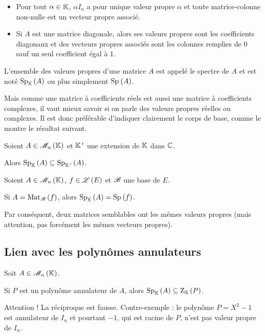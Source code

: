 \begin{ex}
\begin{itemize}
    \item Pour tout \(\alpha\in\mathbb{K}\), \(\alpha I_n\) a pour unique valeur propre \(\alpha\) et toute matrice-colonne non-nulle est un vecteur propre associé. \\
    \item Si \(A\) est une matrice diagonale, alors ses valeurs propres sont les coefficients diagonaux et des vecteurs propres associés sont les colonnes remplies de \(0\) sauf un seul coefficient égal à \(1\).
\end{itemize}
\end{ex}

L'ensemble des valeurs propres d'une matrice \(A\) est appelé le spectre de \(A\) et est noté \(\Sp[\K]{A}\) ou plus simplement \(\Sp{A}\).

Mais comme une matrice à coefficients réels est aussi une matrice à coefficients complexes, il vaut mieux savoir si on parle des valeurs propres réelles ou complexes. Il est donc préférable d'indiquer clairement le corps de base, comme le montre le résultat suivant.

\begin{prop}
Soient \(A\in\M{n}\) et \(\mathbb{K}^{\,\prime}\) une extension de \(\mathbb{K}\) dans \(\mathbb{C}\).

Alors \(\Sp[\K]{A}\subset\Sp[\K\prim]{A}\).
\end{prop}

\begin{prop}
Soient \(A\in\M{n}\), \(f\in\mathscr{L}\left(E\right)\) et \(\mathscr{B}\) une base de \(E\).

Si \(A=\Mat{f}\), alors \(\Sp[\K]{A}=\Sp{f}\).
\end{prop}

Par conséquent, deux matrices semblables ont les mêmes valeurs propres (mais attention, pas forcément les mêmes vecteurs propres).

\subsection{Lien avec les polynômes annulateurs}

\begin{prop}
Soit \(A\in\M{n}\).

Si \(P\) est un polynôme annulateur de \(A\), alors \(\Sp[\K]{A}\subset\rac{P}\).
\end{prop}

Attention ! La réciproque est fausse. Contre-exemple : le polynôme \(P=X^2-1\) est annulateur de \(I_n\) et pourtant \(-1\), qui est racine de \(P\), n'est pas valeur propre de \(I_n\).

